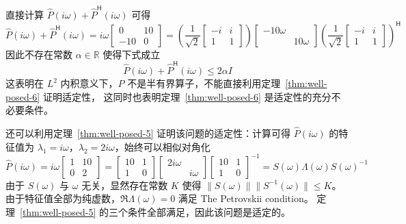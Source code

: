 \begin{remark}
    直接计算 $\widehat{P}(i\omega) + \widehat{P}^\mathsf{H} (i\omega)$ 可得
    \[
        \widehat{P}(i\omega) + \widehat{P}^\mathsf{H} (i\omega) = i \omega
        \begin{bmatrix}
            0 & 10 \\ -10 & 0
        \end{bmatrix}
        =
        \left(\frac{1}{\sqrt{2}}
        \begin{bmatrix}
            -i & i \\ 1 & 1
        \end{bmatrix}\right)
        \begin{bmatrix}
            -10 \omega & \\  & 10 \omega
        \end{bmatrix}
        \left(
        \frac{1}{\sqrt{2}}
        \begin{bmatrix}
            -i & i \\ 1 & 1
        \end{bmatrix}
        \right)^\mathsf{H}
    \]
    因此不存在常数 $\alpha \in \mathbb{R}$ 使得下式成立
    \[
        \widehat{P}(i \omega) + \widehat{P}^\mathsf{H} (i \omega) \le 2\alpha I
    \]
    这表明在 $L^2$ 内积意义下，$P$ 不是半有界算子，不能直接利用定理~\ref{thm:well-posed-6} 证明适定性，
    这同时也表明定理~\ref{thm:well-posed-6} 是适定性的充分不必要条件。
\end{remark}

\begin{remark}
    还可以利用定理~\ref{thm:well-posed-5} 证明该问题的适定性：计算可得 $\widehat{P}(i\omega)$ 的特征值为 $\lambda_1 = i \omega$，$\lambda_2 = 2 i \omega$，始终可以相似对角化
    \[
        \widehat{P}(i\omega) = i \omega
        \begin{bmatrix}
            1 & 10 \\ 0 & 2
        \end{bmatrix}
        =
        \begin{bmatrix}
            10 & 1 \\ 1 & 0
        \end{bmatrix}
        \begin{bmatrix}
            2 i \omega & \\ &  i \omega
        \end{bmatrix}
        \begin{bmatrix}
            10 & 1 \\ 1 & 0
        \end{bmatrix}^{-1}
        = S(\omega) \Lambda(\omega) S(\omega)^{-1}
    \]
    由于 $S(\omega)$ 与 $\omega$ 无关，显然存在常数 $K$ 使得 $\| S(\omega) \| \| S^{-1}(\omega) \| \le K$。
    由于特征值全部为纯虚数，$\Re \Lambda(\omega) = 0$ 满足 The Petrovskii condition。
    定理~\ref{thm:well-posed-5} 的三个条件全部满足，因此该问题是适定的。
\end{remark}

